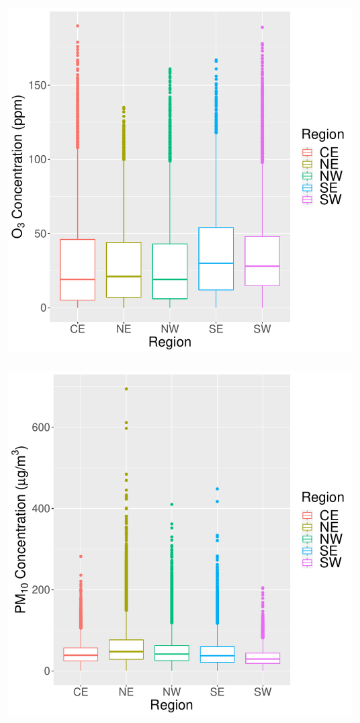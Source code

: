 \documentclass[alpha-refs]{wiley-article}
\begin{document}
\vspace{-2mm}
\begin{figure}[H]
  \begin{center}
   \begin{subfigure}[b]{.32\textwidth}
      \includegraphics[width=\textwidth]{o3_reg_box}
      \label{fig:reg_O3_plots}
   \end{subfigure}
     \begin{subfigure}[b]{.32\textwidth}
     \includegraphics[width=\textwidth]{pm10_reg_box}

\end{subfigure}
\end{center}
\end{figure}
\end{document}
